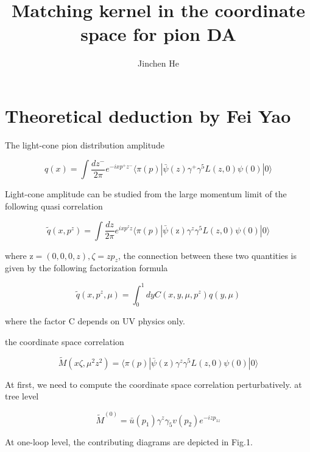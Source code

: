 \documentclass{article}
\title{Matching kernel in the coordinate space for pion DA}
\author{Jinchen He}
\date{}
\begin{document}
\maketitle

\section{Theoretical deduction by Fei Yao}

The light-cone pion distribution amplitude

\begin{equation}
	q(x)=\int \frac{dz^-}{2\pi} e^{-ix p^+ z^-}  \langle \pi(p)|\bar{\psi}(z)  \gamma^{+} \gamma^{5} L(z,0) \psi(0)|0 \rangle
\end{equation}
 
Light-cone amplitude can be studied from the large momentum limit of the following quasi correlation

\begin{equation}
	\tilde{q}(x,p^z)=\int \frac{dz}{2\pi} e^{ix p^z z} \langle \pi(p)|\bar{\psi}(\text{z})  \gamma^{z} \gamma^{5}  L(z,0) \psi(0)|0 \rangle
\end{equation}

where $\text{z}=(0,0,0,z),\zeta=zp_z$, the connection between these two quantities  is given by the following factorization formula

\begin{equation}
   \tilde{q}(x,p^z,\mu)= \int_{0}^{1} dy C(x,y,\mu,p^z) q(y,\mu)
\end{equation}

where the factor C depends on UV physics only.

\phantom{}

the coordinate space correlation

\begin{equation}
	\tilde{M}(x\zeta,\mu^2 z^2 )=\langle \pi(p)|\bar{\psi}(\text{z})  \gamma^{z} \gamma^{5}  L(z,0) \psi(0)|0 \rangle
\end{equation}

\phantom{}

At first, we need to compute the coordinate space correlation perturbatively. at tree level

\begin{equation}
	 \tilde{M}^{(0)}=\bar{u}(p_1)\gamma^z \gamma_5 v(p_2) e^{-izp_{1z}}
\end{equation}


At one-loop level, the contributing diagrams are depicted in Fig.1.
\end{document}
